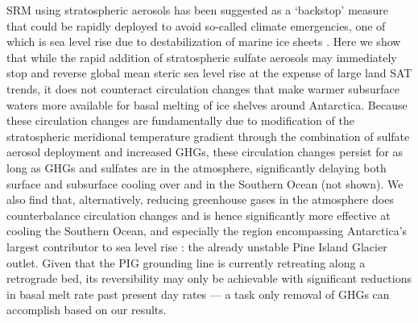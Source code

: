\documentclass[draft,grl]{AGUTeX}  %
\begin{document}
\begin{article}
SRM using stratospheric aerosols has been suggested as a `backstop' measure that could be rapidly deployed to avoid so-called climate emergencies, one of which is sea level rise due to destabilization of marine ice sheets \citep{blackstock09}. Here we show that while the rapid addition of stratospheric sulfate aerosols may immediately stop and reverse global mean steric sea level rise at the expense of large land SAT trends, it does not counteract circulation changes that make warmer subsurface waters more available for basal melting of ice shelves around Antarctica. Because these circulation changes are fundamentally due to modification of the stratospheric meridional temperature gradient through the combination of sulfate aerosol deployment and increased GHGs, these circulation changes persist for as long as GHGs and sulfates are in the atmosphere, significantly delaying both surface and subsurface cooling over and in the Southern Ocean (not shown). We also find that, alternatively, reducing greenhouse gases in the atmosphere does counterbalance circulation changes and is hence significantly more effective at cooling the Southern Ocean, and especially the region encompassing Antarctica's largest contributor to sea level rise \citep{shepherd12}: the already unstable \cite{rignot14} Pine Island Glacier outlet. Given that the PIG grounding line is currently retreating along a retrograde bed, its reversibility may only be achievable with significant reductions in basal melt rate past present day rates \citep{favier14} --- a task only removal of GHGs can accomplish based on our results.


\end{article}
\end{document}
